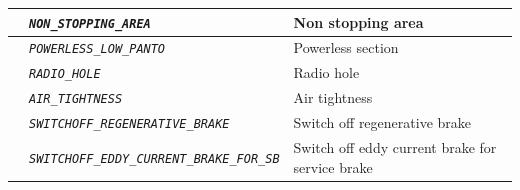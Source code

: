 \begin{itemize}
\begin{longtable}{|l|l|l|}
			\hline

			&	\begin{minipage}[t]{0.40\linewidth} \emph{\texttt{NON\_STOPPING\_AREA}} \end{minipage}
			&	\begin{minipage}[t]{0.33\linewidth} Non stopping area \end{minipage} \\

			\hline

			&	\begin{minipage}[t]{0.40\linewidth} \emph{\texttt{POWERLESS\_LOW\_PANTO}} \end{minipage}
			&	\begin{minipage}[t]{0.33\linewidth} Powerless section \end{minipage} \\

			\hline

			&	\begin{minipage}[t]{0.40\linewidth} \emph{\texttt{RADIO\_HOLE}} \end{minipage}
			&	\begin{minipage}[t]{0.33\linewidth} Radio hole \end{minipage} \\

			\hline

			&	\begin{minipage}[t]{0.40\linewidth} \emph{\texttt{AIR\_TIGHTNESS}} \end{minipage}
			&	\begin{minipage}[t]{0.33\linewidth} Air tightness \end{minipage} \\

			\hline

			&	\begin{minipage}[t]{0.40\linewidth} \emph{\texttt{SWITCHOFF\_REGENERATIVE\_BRAKE}} \end{minipage}
			&	\begin{minipage}[t]{0.33\linewidth} Switch off regenerative brake \end{minipage} \\

			\hline

			&	\begin{minipage}[t]{0.40\linewidth} \emph{\texttt{SWITCHOFF\_EDDY\_CURRENT\_BRAKE\_FOR\_SB}} \end{minipage}
			&	\begin{minipage}[t]{0.33\linewidth} Switch off eddy current brake for service brake \end{minipage} \\


\end{longtable}
\end{itemize}
